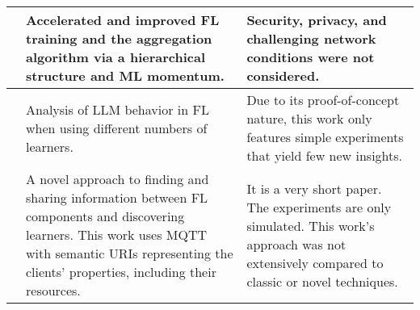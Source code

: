 \begin{changemargin}{-2cm}{0cm}
\begin{tabular}{|c||m{0.4\paperwidth}|m{0.4\paperwidth}|}
            &
            Accelerated and improved FL training and the aggregation algorithm via a hierarchical structure and ML momentum.
            &
            Security, privacy, and challenging network conditions were not considered.
        \\
        \hline
            \cite{paper:scaling_fl_for_fine_tuning_llms}
            &
            Analysis of LLM behavior in FL when using different numbers of learners.
            &
            Due to its proof-of-concept nature, this work only features simple experiments that yield few new insights.
        \\
        \hline
            \cite{paper:edge_fl_via_mqtt_and_oma_lightweight_m2m}
            &
            A novel approach to finding and sharing information between FL components and discovering learners.
            This work uses MQTT with semantic URIs representing the clients' properties, including their resources.
            &
            It is a very short paper.
            The experiments are only simulated.
            This work's approach was not extensively compared to classic or novel techniques.
        \\
        \hline
    \end{tabular}
    \label{table:additional_fl_research_table_1}
\end{changemargin}